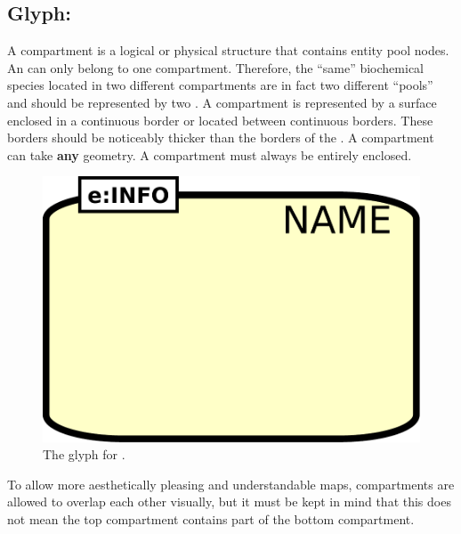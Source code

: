
\subsection{Glyph: }\label{sec:compartment}

A compartment is a logical or physical structure that contains entity pool nodes. An  can only belong to one compartment. Therefore, the ``same'' biochemical species located in two different compartments are in fact two different ``pools'' and should be represented by two .  A compartment is represented by a surface enclosed in a continuous border or located between continuous borders. These borders should be noticeably thicker than the borders of the . A compartment can take \textbf{any} geometry. A compartment must always be entirely enclosed.

\begin{figure}[H]
  \centering
  \includegraphics[scale = 0.3]{le_images/compartment}
  \caption{The \PD glyph for .}
  \label{fig:compartment}
\end{figure}

To allow more aesthetically pleasing and understandable maps, compartments are allowed to overlap each other visually, but it must be kept in mind that this does not mean the top compartment contains part of the bottom compartment. 


%

